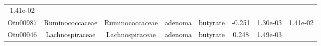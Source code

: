 \documentclass[11pt,]{article}
\begin{document}
\begin{longtable}[]{@{}cccccccc@{}}
\begin{minipage}[t]{0.08\columnwidth}
1.41e-02\strut
\end{minipage}\tabularnewline
\begin{minipage}[t]{0.08\columnwidth}\centering\strut
Otu00987\strut
\end{minipage} & \begin{minipage}[t]{0.15\columnwidth}\centering\strut
Ruminococcaceae\strut
\end{minipage} & \begin{minipage}[t]{0.15\columnwidth}\centering\strut
Ruminococcaceae\strut
\end{minipage} & \begin{minipage}[t]{0.08\columnwidth}\centering\strut
adenoma\strut
\end{minipage} & \begin{minipage}[t]{0.09\columnwidth}\centering\strut
butyrate\strut
\end{minipage} & \begin{minipage}[t]{0.07\columnwidth}\centering\strut
-0.251\strut
\end{minipage} & \begin{minipage}[t]{0.08\columnwidth}\centering\strut
1.30e-03\strut
\end{minipage} & \begin{minipage}[t]{0.08\columnwidth}\centering\strut
1.41e-02\strut
\end{minipage}\tabularnewline
\begin{minipage}[t]{0.08\columnwidth}\centering\strut
Otu00046\strut
\end{minipage} & \begin{minipage}[t]{0.15\columnwidth}\centering\strut
Lachnospiraceae\strut
\end{minipage} & \begin{minipage}[t]{0.15\columnwidth}\centering\strut
Lachnospiraceae\strut
\end{minipage} & \begin{minipage}[t]{0.08\columnwidth}\centering\strut
adenoma\strut
\end{minipage} & \begin{minipage}[t]{0.09\columnwidth}\centering\strut
butyrate\strut
\end{minipage} & \begin{minipage}[t]{0.07\columnwidth}\centering\strut
0.248\strut
\end{minipage} & \begin{minipage}[t]{0.08\columnwidth}\centering\strut
1.49e-03\strut
\end{minipage} & \begin{minipage}[t]{0.08\columnwidth}\centering\strut

\end{minipage}
\end{longtable}
\end{document}
